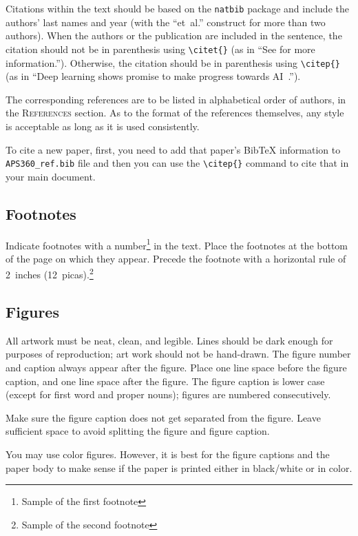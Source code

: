 \documentclass{article} %
\begin{document}
Citations within the text should be based on the \texttt{natbib} package
and include the authors' last names and year (with the ``et~al.'' construct
for more than two authors). When the authors or the publication are
included in the sentence, the citation should not be in parenthesis using \verb|\citet{}| (as
in ``See \citet{Hinton06} for more information.''). Otherwise, the citation
should be in parenthesis using \verb|\citep{}| (as in ``Deep learning shows promise to make progress
towards AI~\citep{Bengio+chapter2007}.'').

The corresponding references are to be listed in alphabetical order of
authors, in the \textsc{References} section. As to the format of the
references themselves, any style is acceptable as long as it is used
consistently.

To cite a new paper, first, you need to add that paper's BibTeX information to \verb+APS360_ref.bib+ file and then you can use the \verb|\citep{}| command to cite that in your main document. 

\subsection{Footnotes}

Indicate footnotes with a number\footnote{Sample of the first footnote} in the
text. Place the footnotes at the bottom of the page on which they appear.
Precede the footnote with a horizontal rule of 2~inches
(12~picas).\footnote{Sample of the second footnote}

\subsection{Figures}

All artwork must be neat, clean, and legible. Lines should be dark
enough for purposes of reproduction; art work should not be
hand-drawn. The figure number and caption always appear after the
figure. Place one line space before the figure caption, and one line
space after the figure. The figure caption is lower case (except for
first word and proper nouns); figures are numbered consecutively.

Make sure the figure caption does not get separated from the figure.
Leave sufficient space to avoid splitting the figure and figure caption.

You may use color figures.
However, it is best for the
figure captions and the paper body to make sense if the paper is printed
either in black/white or in color.
\end{document}

